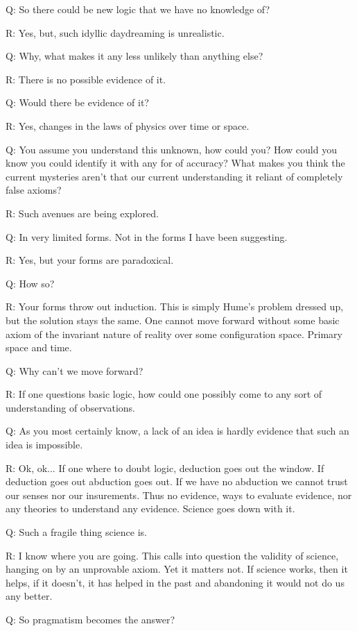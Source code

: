 Q: So there could be new logic that we have no knowledge of?

R: Yes, but, such idyllic daydreaming is unrealistic.

Q: Why, what makes it any less unlikely than anything else?

R: There is no possible evidence of it.

Q: Would there be evidence of it?

R: Yes, changes in the laws of physics over time or space.

Q: You assume you understand this unknown, how could you? How could you know you could identify it with any for of accuracy? What makes you think the current mysteries aren't that our current understanding it reliant of completely false axioms?

R: Such avenues are being explored.

Q: In very limited forms. Not in the forms I have been suggesting.

R: Yes, but your forms are paradoxical.

Q: How so?

R: Your forms throw out induction. This is simply Hume's problem dressed up, but the solution stays the same. One cannot move forward without some basic axiom of the invariant nature of reality over some configuration space. Primary space and time.

Q: Why can't we move forward?

R: If one questions basic logic, how could one possibly come to any sort of understanding of observations.

Q: As you most certainly know, a lack of an idea is hardly evidence that such an idea is impossible.

R: Ok, ok... If one where to doubt logic, deduction goes out the window. If deduction goes out abduction goes out. If we have no abduction we cannot trust our senses nor our insurements. Thus no evidence, ways to evaluate evidence, nor any theories to understand any evidence. Science goes down with it.

Q: Such a fragile thing science is.

R: I know where you are going. This calls into question the validity of science, hanging on by an unprovable axiom. Yet it matters not. If science works, then it helps, if it doesn't, it has helped in the past and abandoning it would not do us any better.

Q: So pragmatism becomes the answer?

